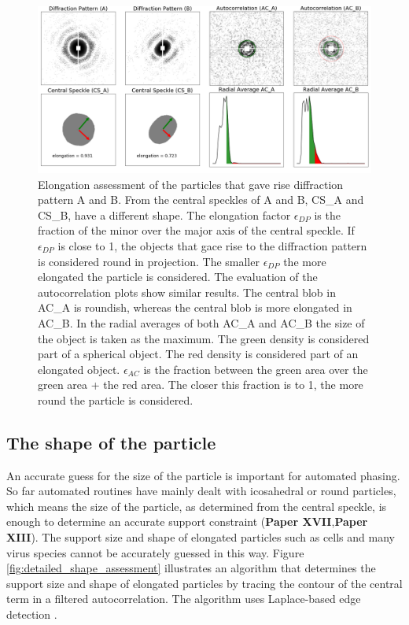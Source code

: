 \begin{figure}[!h]
\centering
\includegraphics[width=120mm]{Chapter_08_ImageClassification_shape_assessment.png}
\caption{Elongation assessment of the particles that gave rise diffraction pattern A and B. From the central speckles of A and B, CS\_A and CS\_B, have a different shape. The elongation factor $\epsilon_{DP}$ is the fraction of the minor over the major axis of the central speckle. If $\epsilon_{DP}$ is close to 1, the objects that gace rise to the diffraction pattern is considered round in projection. The smaller $\epsilon_{DP}$ the more elongated the particle is considered. The evaluation of the autocorrelation plots show similar results. The central blob in AC\_A is roundish, whereas the central blob is more elongated in AC\_B. In the radial averages of both AC\_A and AC\_B the size of the object is taken as the maximum. The green density is considered part of a spherical object. The red density is considered part of an elongated object. $\epsilon_{AC}$ is the fraction between the green area over the green area + the red area. The closer this fraction is to 1, the more round the particle is considered.}\label{fig:shape_assessment}
\end{figure}


\subsection{The shape of the particle}
An accurate guess for the size of the particle is important for automated phasing. So far automated routines have mainly dealt with icosahedral or round particles, which means the size of the particle, as determined from the central speckle, is enough to determine an accurate support constraint (\textbf{Paper XVII},\textbf{Paper XIII}). The support size and shape of elongated particles such as  cells and many virus species cannot be accurately guessed in this way. Figure \ref{fig:detailed_shape_assessment} illustrates an algorithm that determines the support size and shape of elongated particles by tracing the contour of the central term in a filtered autocorrelation. The algorithm uses Laplace-based edge detection \cite{Mathworks2018}. 

